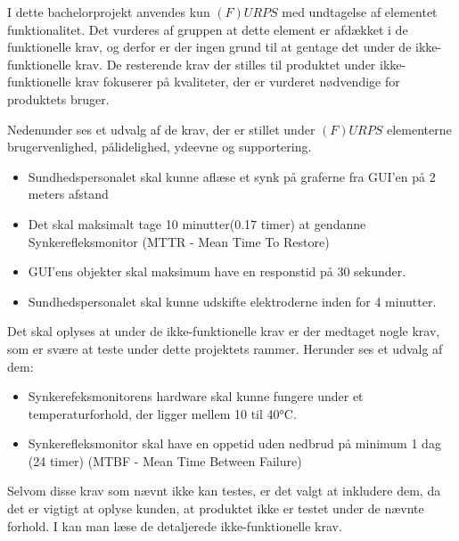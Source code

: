 I dette bachelorprojekt anvendes kun $(F)URPS$ med undtagelse af  elementet funktionalitet. Det vurderes af gruppen at  dette element er afdækket i de funktionelle krav, og derfor er der ingen grund til at gentage det under de ikke-funktionelle krav. De resterende krav der stilles til produktet under ikke-funktionelle krav fokuserer på kvaliteter, der er vurderet nødvendige for produktets bruger. 

Nedenunder ses et udvalg af de krav, der  er stillet under $(F)URPS$ elementerne brugervenlighed, pålidelighed, ydeevne og supportering. 

\begin{itemize}
\item Sundhedspersonalet skal kunne aflæse et synk på graferne fra GUI'en på 2 meters afstand

\item Det skal maksimalt tage 10 minutter(0.17 timer) at gendanne Synkerefleksmonitor (MTTR - Mean Time To Restore)

\item GUI'ens objekter skal maksimum have en responstid på 30 sekunder. 

\item Sundhedspersonalet skal kunne udskifte elektroderne inden for 4 minutter.
\end{itemize}

Det skal oplyses at under de ikke-funktionelle krav er der medtaget nogle krav, som er svære at teste under dette projektets rammer. Herunder ses et udvalg af dem:

\begin{itemize}
\item  Synkerefeksmonitorens hardware skal kunne fungere under et temperaturforhold, der ligger mellem 10 til 40°C.
\item Synkerefleksmonitor skal have en oppetid uden nedbrud på minimum 1 dag (24 timer) (MTBF - Mean Time Between Failure)
\end{itemize}

Selvom disse krav som nævnt ikke kan testes, er det valgt at inkludere dem, da det er vigtigt at oplyse kunden, at produktet ikke er testet under de nævnte forhold. I  kan man læse de detaljerede ikke-funktionelle krav.

 


 

